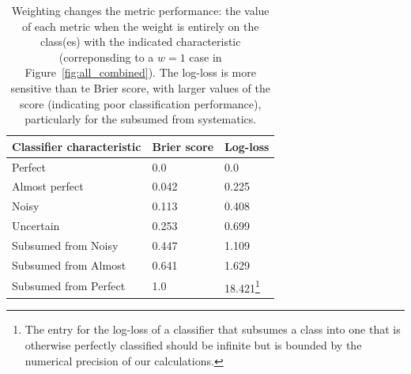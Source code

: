 
\begin{table}[]
\begin{tabular}{lll}
Classifier characteristic & Brier score & Log-loss\\
\hline
Perfect & 0.0 & 0.0\\
Almost perfect & 0.042 & 0.225\\
Noisy & 0.113 & 0.408\\
Uncertain & 0.253 & 0.699\\
Subsumed from Noisy & 0.447 & 1.109\\
Subsumed from Almost & 0.641 & 1.629\\
Subsumed from Perfect & 1.0 & 18.421\footnote{The entry for the log-loss of a classifier that subsumes a class into one that is otherwise perfectly classified should be infinite but is bounded by the numerical precision of our calculations.}
\end{tabular}
\caption{Weighting changes the metric performance: the value of each metric when the weight is entirely on the class(es) with the indicated characteristic (correponsding to a $w=1$ case in Figure~\ref{fig:all_combined}). The log-loss is more sensitive than te Brier score, with larger values of the score (indicating poor classification performance), particularly for the subsumed from systematics.}
\label{tab:extents}
\end{table}

